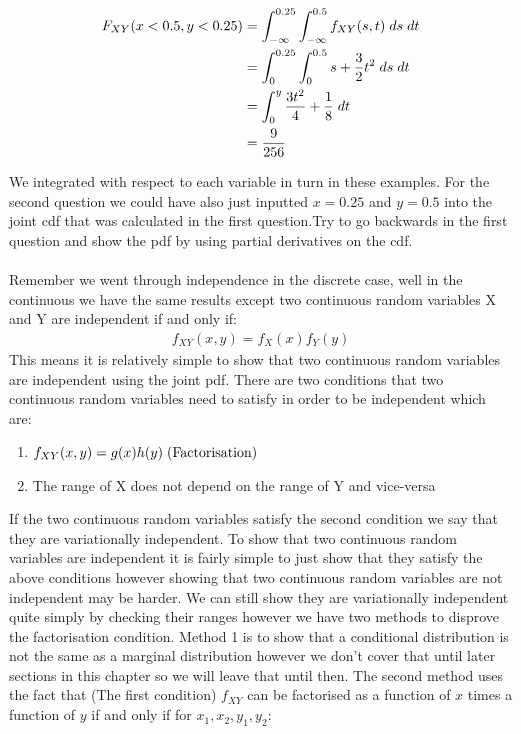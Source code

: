 \documentclass[,oneside]{article}
\begin{document}
\begin{enumerate}
\begin{enumerate}
\begin{align*}
F_{XY}(x < 0.5,y < 0.25)&=\int_{-\infty}^{0.25}\int_{-\infty}^{0.5} f_{XY}(s, t)\hspace{0.1cm}ds\hspace{0.1cm}dt\\
&=\int_{0}^{0.25}\int_{0}^{0.5} s+\frac{3}{2}t^2\hspace{0.1cm}ds\hspace{0.1cm}dt\\
&=\int_{0}^{y} \frac{3t^2}{4}+\frac{1}{8}\hspace{0.1cm}dt\\
&= \frac{9}{256}
\end{align*}
\end{enumerate}
We integrated with respect to each variable in turn in these examples. For the second question we could have also just inputted $x =0.25$ and $y=0.5$ into the joint cdf that was calculated in the first question.Try to go backwards in the first question and show the pdf by using partial derivatives on the cdf.\\ \\
Remember we went through independence in the discrete case, well in the continuous we have the same results except two continuous random variables X and Y are independent if and only if: 
\begin{align*}
f_{XY}(x,y) = f_X(x)f_Y(y)
\end{align*}
This means it is relatively simple to show that two continuous random variables are independent using the joint pdf. There are two conditions that two continuous random variables need to satisfy in order to be independent which are:\\
\begin{enumerate}
\item $f_{XY}(x,y) = g(x)h(y) \hspace{0.1cm}\text{(Factorisation)}$
\item The range of X does not depend on the range of Y and vice-versa\\
\end{enumerate}
If the two continuous random variables satisfy the second condition we say that they are variationally independent. To show that two continuous random variables are independent it is fairly simple to just show that they satisfy the above conditions however showing that two continuous random variables are not independent may be harder. We can still show they are variationally independent quite simply by checking their ranges however we have two methods to disprove the factorisation condition. Method 1 is to show that a conditional distribution is not the same as a marginal distribution however we don't cover that until later sections in this chapter so we will leave that until then. The second method uses the fact that (The first condition) $f_{XY}$ can be factorised as a function of $x$ times a function of $y$ if and only if for $x_1, x_2, y_1, y_2$:

\end{enumerate}
\end{document}

